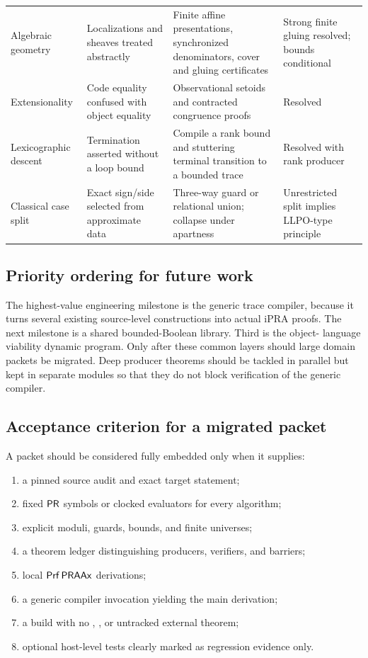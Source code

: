 \begin{longtable}{@{}p{}p{}p{}p{}@{}}
Algebraic geometry & Localizations and sheaves treated abstractly &
Finite affine presentations, synchronized denominators, cover and gluing certificates &
Strong finite gluing resolved; bounds conditional \\

Exten\-sion\-al\-ity & Code equality confused with object equality &
Observational setoids and contracted congruence proofs &
Resolved \\

Lexicographic descent & Termination asserted without a loop bound &
Compile a rank bound and stuttering terminal transition to a bounded trace &
Resolved with rank producer \\

Classical case split & Exact sign/side selected from approximate data &
Three-way guard or relational union; collapse under apartness &
Unrestricted split implies LLPO-type principle \\
\bottomrule
\end{longtable}

\subsection{Priority ordering for future work}

The highest-value engineering milestone is the generic trace compiler, because
it turns several existing source-level constructions into actual iPRA proofs.
The next milestone is a shared bounded-Boolean library.  Third is the object-
language viability dynamic program.  Only after these common layers should
large domain packets be migrated.  Deep producer theorems should be tackled in
parallel but kept in separate modules so that they do not block verification of
the generic compiler.

\subsection{Acceptance criterion for a migrated packet}

A packet should be considered fully embedded only when it supplies:
\begin{enumerate}
\item a pinned source audit and exact target statement;
\item fixed \(\mathsf{PR}\) symbols or clocked evaluators for every algorithm;
\item explicit moduli, guards, bounds, and finite universes;
\item a theorem ledger distinguishing producers, verifiers, and barriers;
\item local \(\mathsf{Prf}\,\mathsf{PRAAx}\) derivations;
\item a generic compiler invocation yielding the main derivation;
\item a build with no , , or untracked external theorem;
\item optional host-level tests clearly marked as regression evidence only.
\end{enumerate}
